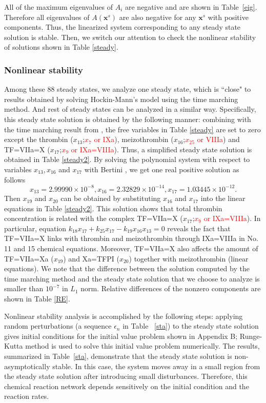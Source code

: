 All of the maximum eigenvalues of $A_i$ are negative and are shown in
Table~\ref{eig}. Therefore all eigenvalues of $A(\mathbf{x}^s)$ are
also negative for any $\mathbf{x}^s$ with positive components. Thus,
 the linearized system corresponding to any steady state solution is
stable. Then, we switch our attention to check the nonlinear
stability of solutions shown in Table \ref{steady}.

\subsubsection*{Nonlinear stability}
Among these $88$ steady states, we analyze one steady state, which
is ``close" to results obtained by solving Hockin-Mann's model
\cite{HocJon02} using the time marching method. And rest of steady states can be analyzed in a similar way. Specifically, this
steady state solution is obtained by the following manner: combining
with the time marching result from \cite{HocJon02}, the free
variables in Table \ref{steady} are set to zero except the thrombin
($x_{13}$;\textcolor{red}{$x_{7}$ or IXa}), meizothrombin ($x_{16}$;\textcolor{red}{$x_{25}$ or VIIIa}) and TF=VIIa=X ($x_{17}$;\textcolor{red}{$x_{9}$ or IXa=VIIIa}). Thus,
a simplified steady state solution is obtained in Table
\ref{steady2}.
By solving the polynomial system with respect to variables
$x_{13},x_{16}$ and $x_{17}$ with Bertini \cite{Bertini}, we get one
real positive solution as follows
\[
x_{13}=2.99990\times10^{-8},x_{16}=2.32829\times10^{-14},
x_{17}=1.03445\times10^{-12}.\] Then $x_{19}$ and $x_{20}$ can be
obtained by substituting $x_{16}$ and $x_{17}$ into the linear
equations in Table \ref{steady2}. This solution shows that total
thrombin concentration is related with the complex TF=VIIa=X
($x_{17}$;\textcolor{red}{$x_{9}$ or IXa=VIIIa}). In particular, equation
$k_{18}x_{17}+k_{25}x_{17}-k_{19}x_{16}x_{13}=0$ reveals the fact
that TF=VIIa=X links with thrombin and meizothrombin through
IXa=VIIIa in No. 11 and 15 chemical equations. Moreover, TF=VIIa=X
also affects the amount of TF=VIIa=Xa ($x_{19}$) and Xa=TFPI
($x_{20}$) together with meizothrombin (linear equations).  We note that the difference between the solution computed by the
time marching method and the steady state solution that we choose to
analyze is smaller than  $10^{-7}$ in $L_1$ norm. Relative
differences of the nonzero components are shown in  Table \ref{RE}.

Nonlinear stability analysis is accomplished by the following steps:
applying random perturbations (a sequence $\epsilon_n$ in Table
~\ref{sta}) to the steady state solution gives initial conditions
for the initial value problem shown in Appendix B; Runge-Kutta
method is used to solve this initial value problem numerically. The
results, summarized in Table~\ref{sta}, demonstrate that the steady
state solution is non-asymptotically stable. In this case, the
system moves away in a small region from the steady state solution
after introducing small disturbances. Therefore, this chemical
reaction network depends sensitively on the initial condition and
the reaction rates.

